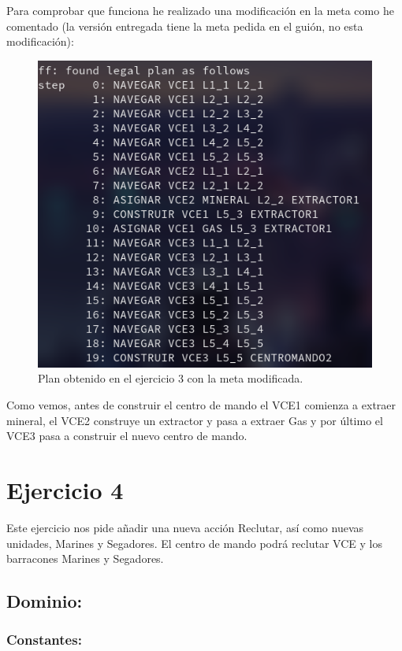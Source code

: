 \documentclass[11pt, spanish]{article}
\begin{document}
Para comprobar que funciona he realizado una modificación en la meta como he comentado (la versión entregada tiene la meta pedida en el guión, no esta modificación):


\begin{figure}[H]
	\centering
	\includegraphics[scale=0.4]{plan3C.png}
	\caption{Plan obtenido en el ejercicio 3 con la meta modificada.}
	\label{plan3C}
\end{figure}

Como vemos, antes de construir el centro de mando el VCE1 comienza a extraer mineral, el VCE2 construye un extractor y pasa a extraer Gas y por último el VCE3 pasa a construir el nuevo centro de mando.

\section{Ejercicio 4}

Este ejercicio nos pide añadir una nueva acción Reclutar, así como nuevas unidades, Marines y Segadores. El centro de mando podrá reclutar VCE y los barracones Marines y Segadores.

\subsection{Dominio:}

\subsubsection{Constantes:}
\end{document}
